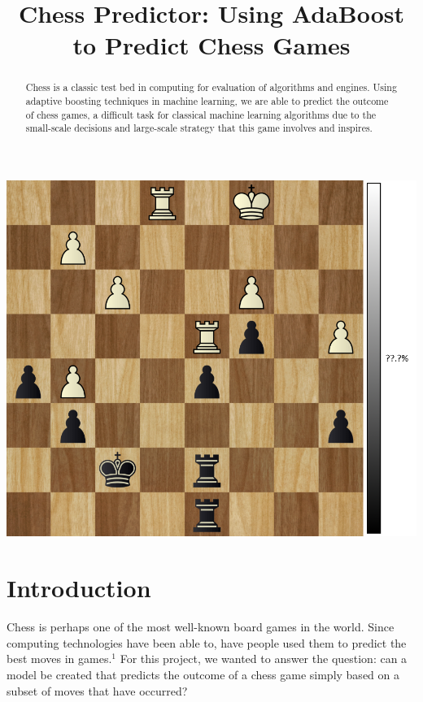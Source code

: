 \documentclass[]{interact}
\theoremstyle{plain}%
\theoremstyle{definition}
\theoremstyle{remark}
\begin{document}
\title{Chess Predictor: Using AdaBoost to Predict Chess Games}

\author{
}

\maketitle

\begin{center}
\includegraphics[scale=0.25]{intro.png}
\end{center}

\begin{abstract}
    Chess is a classic test bed in computing for evaluation of algorithms and engines. Using adaptive boosting techniques in machine learning, we are able to predict the outcome of chess games, a difficult task for classical machine learning algorithms due to the small-scale decisions and large-scale strategy that this game involves and inspires.
\end{abstract}

\section{Introduction}
Chess is perhaps one of the most well-known board games in the world. Since computing technologies have been able to, have people used them to predict the best moves in games.$^1$ For this project, we wanted to answer the question: can a model be created that predicts the outcome of a chess game simply based on a subset of moves that have occurred?
\end{document}
